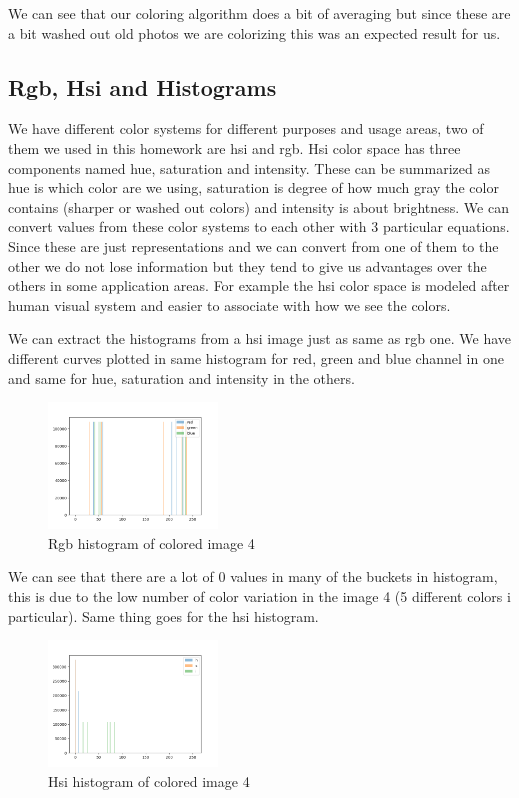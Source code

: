 \documentclass[conference]{IEEEtran}
\begin{document}
We can see that our coloring algorithm does a bit of averaging but since these are a bit washed out old photos we are colorizing this was an expected result for us.

\subsection{Rgb, Hsi and Histograms}
We have different color systems for different purposes and usage areas, two of them we used in this homework are hsi and rgb. Hsi color space has three components named hue, saturation and intensity. These can be summarized as hue is which color are we using, saturation is  degree of how much gray the color contains (sharper or washed out colors) and intensity is about brightness. We can convert values from these color systems to each other with 3 particular equations. Since these are just representations and we can convert from one of them to the other we do not lose information but they tend to give us advantages over the others in some application areas. For example the hsi color space is modeled after human visual system and easier to associate with how we see the colors. 

We can extract the histograms from a hsi image just as same as rgb one. We have different curves plotted in same histogram for red, green and blue channel in one and same for hue, saturation and intensity in the others. 

\begin{figure}[H]
    \centering
    \includegraphics[width=0.4\textwidth]{resources/4_rgb_histogram.png}
    \caption{Rgb histogram of colored image 4}
    \label{fig:image_4_rgb_histogram}
\end{figure}

We can see that there are a lot of 0 values in many of the buckets in histogram, this is due to the low number of color variation in the image 4 (5 different colors i particular). Same thing goes for the hsi histogram.

\begin{figure}[H]
    \centering
    \includegraphics[width=0.4\textwidth]{resources/4_hsi_histogram.png}
    \caption{Hsi histogram of colored image 4}
    \label{fig:image_4_hsi_histogram}
\end{figure}
\end{document}
